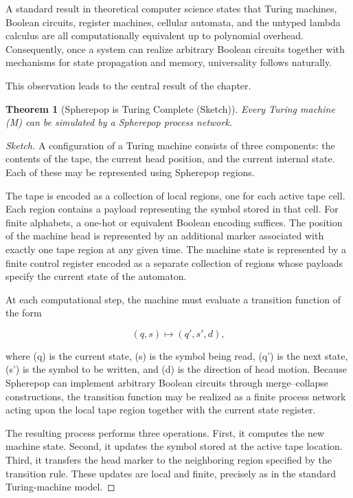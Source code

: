 \documentclass[12pt,letterpaper]{article}
\newtheorem{theorem}{Theorem}[section]
\theoremstyle{remark}
\begin{document}
A standard result in theoretical computer science states that Turing machines, Boolean circuits, register machines, cellular automata, and the untyped lambda calculus are all computationally equivalent up to polynomial overhead. Consequently, once a system can realize arbitrary Boolean circuits together with mechanisms for state propagation and memory, universality follows naturally.

This observation leads to the central result of the chapter.

\begin{theorem}[Spherepop is Turing Complete (Sketch)]
Every Turing machine (M) can be simulated by a Spherepop process network.
\end{theorem}

\begin{proof}[Sketch]
A configuration of a Turing machine consists of three components: the contents of the tape, the current head position, and the current internal state. Each of these may be represented using Spherepop regions.

The tape is encoded as a collection of local regions, one for each active tape cell. Each region contains a payload representing the symbol stored in that cell. For finite alphabets, a one-hot or equivalent Boolean encoding suffices. The position of the machine head is represented by an additional marker associated with exactly one tape region at any given time. The machine state is represented by a finite control register encoded as a separate collection of regions whose payloads specify the current state of the automaton.

At each computational step, the machine must evaluate a transition function of the form

\[
(q,s)
\mapsto
(q',s',d),
\]

where (q) is the current state, (s) is the symbol being read, (q') is the next state, (s') is the symbol to be written, and (d) is the direction of head motion. Because Spherepop can implement arbitrary Boolean circuits through merge--collapse constructions, the transition function may be realized as a finite process network acting upon the local tape region together with the current state register.

The resulting process performs three operations. First, it computes the new machine state. Second, it updates the symbol stored at the active tape location. Third, it transfers the head marker to the neighboring region specified by the transition rule. These updates are local and finite, precisely as in the standard Turing-machine model.


\end{proof}
\end{document}
